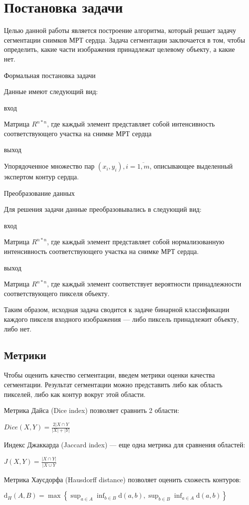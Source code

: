 \section{Постановка задачи}

Целью данной работы является построение алгоритма, который решает задачу сегментации снимков МРТ сердца. Задача сегментации заключается в том, чтобы определить, какие части изображения принадлежат целевому объекту, а какие нет. 

Формальная постановка задачи

Данные имеют следующий вид:

вход 

Матрица $R^{n*n}$, где каждый элемент представляет собой интенсивность соответствующего участка на снимке МРТ сердца

выход

Упорядоченное множество пар $(x_i,y_i), i = \overline{1,m}$, описывающее выделенный экспертом контур сердца.

Преобразование данных

Для решения задачи данные преобразовывались в следующий вид:

вход

Матрица $R^{n*n}$, где каждый элемент представляет собой нормализованную интенсивность соответствующего участка на снимке МРТ сердца.

выход

Матрица $R^{n*n}$, где каждый элемент соответствует вероятности принадлежности соответствующего пикселя объекту. 

Таким образом, исходная задача сводится к задаче бинарной классификации каждого пикселя входного изображения — либо пиксель принадлежит объекту, либо нет.

\subsection{Метрики}

Чтобы оценить качество сегментации, введем метрики оценки качества сегментации. Результат сегментации можно представить либо как область пикселей, либо как контур вокруг этой области. 

Метрика Дайса (Dice index) позволяет сравнить 2 области:

$Dice(X,Y) = \frac{2|X\cap{}Y}{|X| + |Y|}$

Индекс Джаккарда (Jaccard index) — еще одна метрика для сравнения областей:

$J(X,Y) = \frac{|X\cap{}Y|}{|X\cup{}Y}$

Метрика Хаусдорфа (Hausdorff distance) позволяет оценить схожесть контуров:

$\mathrm{d}_{H}(A,B)=\max\left\{\sup_{a\in{}A}\inf_{b\in{}B}\mathrm{d}(a,b),\sup_{b\in{}B}\inf_{a\in{}A}\mathrm{d}(a,b)\right\}$


